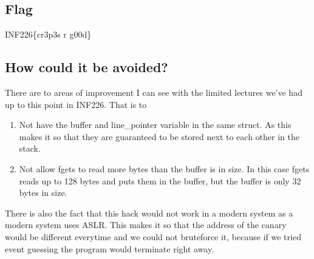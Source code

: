 \documentclass{article}
\begin{document}
\subsection{Flag}
INF226\{cr3p3s r g00d\}

\subsection{How could it be avoided?}
There are to areas of improvement I can see with the limited lectures we've had up to this point in INF226. That is to \begin{enumerate}
    \item Not have the buffer and line\_pointer variable in the same struct. As this makes it so that they are guaranteed to be stored next to each other in the stack.
    \item Not allow fgets to read more bytes than the buffer is in size. In this case fgets reads up to 128 bytes and puts them in the buffer, but the buffer is only 32 bytes in size.
\end{enumerate}

There is also the fact that this hack would not work in a modern system as a modern system uses ASLR. This makes it so that the address of the canary would be different everytime and we could not bruteforce it, because if we tried event guessing the program would terminate right away.
\end{document}
